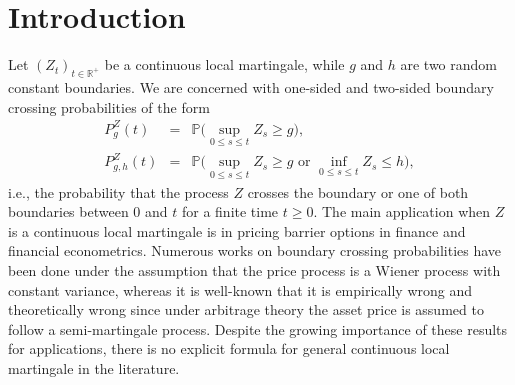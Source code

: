 \documentclass[aop]{imsart}
\theoremstyle{plain}
\theoremstyle{remark}
\newcommand{\reels}{\mathbb{R}}
\newcommand{\proba}{\mathbb{P}}
\begin{document}
\section{Introduction}
Let $(Z_t)_{t \in \reels^+}$ be a continuous local martingale, while $g$ and $h$ are two random constant boundaries. We are concerned with one-sided and two-sided boundary crossing probabilities of the form
\begin{eqnarray}
\label{def_bcp}
P_g^Z(t) & = & \proba \big( \sup_{0 \leq s \leq t} Z_s    \geq g\big),\\ \label{def_bcp2} P_{g,h}^Z(t) & = & \proba \big( \sup_{0 \leq s \leq t} Z_s   \geq g \text{ or } \inf_{0 \leq s \leq t} Z_s  \leq h \big), 
\end{eqnarray}
i.e., the probability that the process $Z$ crosses the boundary or one of both boundaries between $0$ and $t$ for a finite time $t \geq 0$. The main application when $Z$ is a continuous local martingale is in pricing barrier options in finance and financial econometrics. Numerous works on boundary crossing probabilities have been done under the assumption that the price process is a Wiener process with constant variance, whereas it is well-known that it is empirically wrong and theoretically wrong since under arbitrage theory the asset price is assumed to follow a semi-martingale process. Despite the growing importance of these results for applications, there is no explicit formula for general continuous local martingale in the literature.
\end{document}
